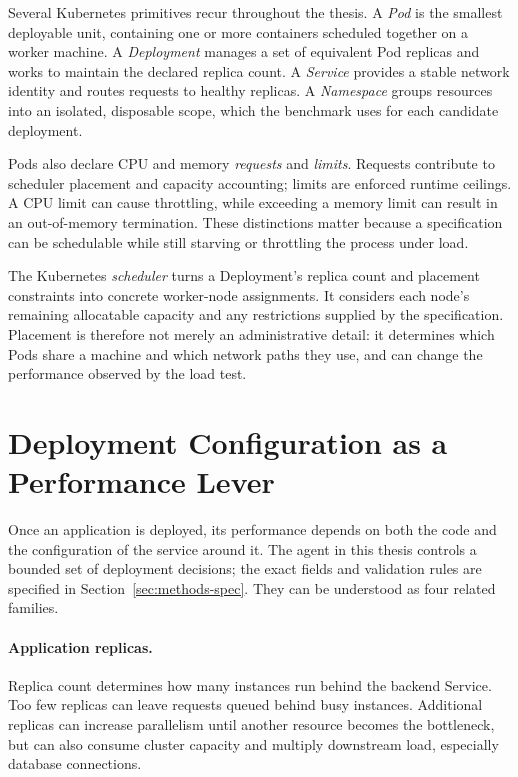 Several Kubernetes primitives recur throughout the thesis. A \emph{Pod} is
the smallest deployable unit, containing one or more containers scheduled
together on a worker machine. A \emph{Deployment} manages a set of equivalent
Pod replicas and works to maintain the declared replica count. A \emph{Service}
provides a stable network identity and routes requests to healthy replicas.
A \emph{Namespace} groups resources into an isolated, disposable scope, which
the benchmark uses for each candidate deployment.

Pods also declare CPU and memory \emph{requests} and \emph{limits}. Requests
contribute to scheduler placement and capacity accounting; limits are enforced
runtime ceilings. A CPU limit can cause throttling, while exceeding a memory
limit can result in an out-of-memory termination. These distinctions matter
because a specification can be schedulable while still starving or throttling
the process under load.

The Kubernetes \emph{scheduler} turns a Deployment's replica count and
placement constraints into concrete worker-node assignments. It considers
each node's remaining allocatable capacity and any restrictions supplied by
the specification. Placement is therefore not merely an administrative
detail: it determines which Pods share a machine and which network paths they
use, and can change the performance observed by the load test.


\section{Deployment Configuration as a Performance Lever}
\label{sec:background-deployment-levers}

Once an application is deployed, its performance depends on both the code and
the configuration of the service around it. The agent in this thesis controls
a bounded set of deployment decisions; the exact fields and validation rules
are specified in Section~\ref{sec:methods-spec}. They can be understood as
four related families.

\paragraph{Application replicas.}
Replica count determines how many instances run behind the backend Service.
Too few replicas can leave requests queued behind busy instances. Additional
replicas can increase parallelism until another resource becomes the
bottleneck, but can also consume cluster capacity and multiply downstream
load, especially database connections.

